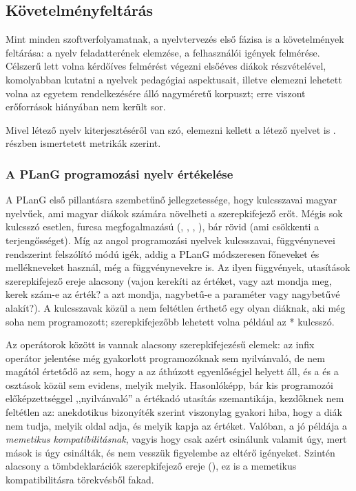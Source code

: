 
\subsection{Követelményfeltárás}

Mint minden szoftverfolyamatnak, a nyelvtervezés első fázisa is a követelmények feltárása: a nyelv feladatterének elemzése, a felhasználói igények felmérése.
Célszerű lett volna kérdőíves felmérést végezni elsőéves diákok részvételével, komolyabban kutatni a nyelvek pedagógiai aspektusait, illetve elemezni lehetett volna az egyetem rendelkezésére álló nagyméretű korpuszt; erre viszont erőforrások hiányában nem került sor.

Mivel létező nyelv kiterjesztéséről van szó, elemezni kellett a létező nyelvet is . részben ismertetett metrikák szerint.

\subsubsection{A PLanG programozási nyelv értékelése}


A PLanG első pillantásra szembetűnő jellegzetessége, hogy kulcsszavai magyar nyelvűek, ami magyar diákok számára növelheti a szerepkifejező erőt.
Mégis sok kulcsszó esetlen, furcsa megfogalmazású (, , , ), bár rövid (ami csökkenti a terjengősséget).
Míg az angol programozási nyelvek kulcsszavai, függvénynevei rendszerint felszólító módú igék, addig a PLanG módszeresen főneveket és mellékneveket használ, még a függvénynevekre is.
Az ilyen függvények, utasítások szerepkifejező ereje alacsony (vajon  kerekíti az értéket, vagy azt mondja meg, kerek szám-e az érték? a  azt mondja, nagybetű-e a paraméter vagy nagybetűvé alakít?).
A kulcsszavak közül a  nem feltétlen érthető egy olyan diáknak, aki még soha nem programozott; szerepkifejezőbb lehetett volna például az * kulcsszó.

Az operátorok között is vannak alacsony szerepkifejezésű elemek: az  infix operátor jelentése még gyakorlott programozóknak sem nyilvánvaló, de nem magától értetődő az sem, hogy a \plang{/=} az áthúzott egyenlőségjel helyett áll, és a  és a \plang{/} osztások közül sem evidens, melyik melyik.
Hasonlóképp, bár kis programozói előképzettséggel ,,nyilvánvaló'' a \plang{:=} értékadó utasítás szemantikája, kezdőknek nem feltétlen az: anekdotikus bizonyíték szerint viszonylag gyakori hiba, hogy a diák nem tudja, melyik oldal adja, és melyik kapja az értéket.
Valóban, a \plang{:=} jó példája a \textit{memetikus kompatibilitásnak}, vagyis hogy csak azért csinálunk valamit úgy, mert mások is úgy csinálták, és nem vesszük figyelembe az eltérő igényeket\cite[6.1.5.2. rész]{McIver01}.
Szintén alacsony a tömbdeklarációk szerepkifejező ereje (), ez is a memetikus kompatibilitásra törekvésből fakad.

